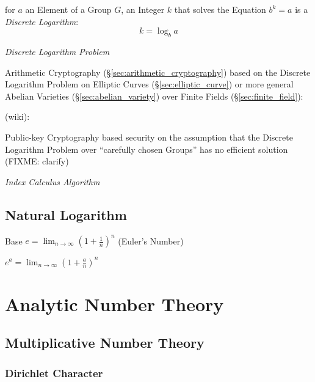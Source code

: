 for $a$ an Element of a Group $G$, an Integer $k$ that solves the Equation $b^k
= a$ is a \emph{Discrete Logarithm}:
\[
  k = \log_b a
\]

\emph{Discrete Logarithm Problem}

\fist Arithmetic Cryptography (\S\ref{sec:arithmetic_cryptography}) based on
the Discrete Logarithm Problem on Elliptic Curves (\S\ref{sec:elliptic_curve})
or more general Abelian Varieties (\S\ref{sec:abelian_variety}) over Finite
Fields (\S\ref{sec:finite_field}):

(wiki):

Public-key Cryptography based security on the assumption that the Discrete
Logarithm Problem over ``carefully chosen Groups'' has no efficient solution
(FIXME: clarify)


\emph{Index Calculus Algorithm}



\subsection{Natural Logarithm}\label{sec:natural_logarithm}

Base $e = \lim_{n \rightarrow \infty} (1 + \frac{1}{n})^n$
(Euler's Number)

$e^a = \lim_{n \rightarrow \infty} (1 + \frac{a}{n})^n$



\section{Analytic Number Theory}\label{sec:analytic_number_theory}

\subsection{Multiplicative Number Theory}
\label{sec:multiplicative_number_theory}

\subsubsection{Dirichlet Character}\label{sec:dirichlet_character}

